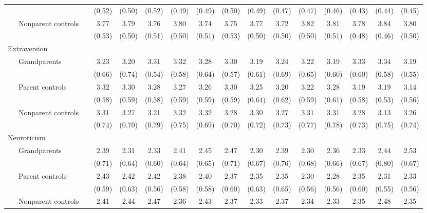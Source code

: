 \begin{appendix}
\begin{lltable}
{\begin{longtable}{lccccccccccccc}
\ \ \ \textcolor{white}{Cp} & (0.52) & (0.50) & (0.52) & (0.49) & (0.49) & (0.50) & (0.49) & (0.47) & (0.47) & (0.46) & (0.43) & (0.44) & (0.45)\\
\ \ \ Nonparent controls \textcolor{white}{C} & 3.77 & 3.79 & 3.76 & 3.80 & 3.74 & 3.75 & 3.77 & 3.72 & 3.82 & 3.81 & 3.78 & 3.84 & 3.80\\
\ \ \ \textcolor{white}{Cn} & (0.53) & (0.50) & (0.51) & (0.50) & (0.51) & (0.53) & (0.50) & (0.50) & (0.50) & (0.51) & (0.48) & (0.46) & (0.50)\\
Extraversion &  &  &  &  &  &  &  &  &  &  &  &  & \\
\ \ \ Grandparents \textcolor{white}{E} & 3.23 & 3.20 & 3.31 & 3.32 & 3.28 & 3.30 & 3.19 & 3.24 & 3.22 & 3.19 & 3.33 & 3.34 & 3.19\\
\ \ \ \textcolor{white}{Eg} & (0.66) & (0.74) & (0.54) & (0.58) & (0.64) & (0.57) & (0.61) & (0.69) & (0.65) & (0.60) & (0.60) & (0.58) & (0.55)\\
\ \ \ Parent controls \textcolor{white}{E} & 3.32 & 3.30 & 3.28 & 3.27 & 3.26 & 3.30 & 3.25 & 3.20 & 3.22 & 3.28 & 3.19 & 3.19 & 3.14\\
\ \ \ \textcolor{white}{Ep} & (0.58) & (0.59) & (0.58) & (0.59) & (0.59) & (0.59) & (0.64) & (0.62) & (0.59) & (0.61) & (0.58) & (0.53) & (0.56)\\
\ \ \ Nonparent controls \textcolor{white}{E} & 3.31 & 3.27 & 3.21 & 3.32 & 3.32 & 3.28 & 3.30 & 3.27 & 3.31 & 3.31 & 3.28 & 3.13 & 3.26\\
\ \ \ \textcolor{white}{En} & (0.74) & (0.70) & (0.79) & (0.75) & (0.69) & (0.70) & (0.72) & (0.73) & (0.77) & (0.78) & (0.73) & (0.75) & (0.74)\\
Neuroticism &  &  &  &  &  &  &  &  &  &  &  &  & \\
\ \ \ Grandparents \textcolor{white}{N} & 2.39 & 2.31 & 2.33 & 2.41 & 2.45 & 2.47 & 2.30 & 2.39 & 2.30 & 2.36 & 2.33 & 2.44 & 2.53\\
\ \ \ \textcolor{white}{Ng} & (0.71) & (0.64) & (0.60) & (0.64) & (0.65) & (0.71) & (0.67) & (0.76) & (0.68) & (0.66) & (0.67) & (0.80) & (0.67)\\
\ \ \ Parent controls \textcolor{white}{N} & 2.43 & 2.42 & 2.42 & 2.38 & 2.40 & 2.37 & 2.35 & 2.35 & 2.30 & 2.28 & 2.35 & 2.31 & 2.33\\
\ \ \ \textcolor{white}{Np} & (0.59) & (0.63) & (0.56) & (0.58) & (0.58) & (0.60) & (0.63) & (0.65) & (0.56) & (0.56) & (0.60) & (0.55) & (0.56)\\
\ \ \ Nonparent controls \textcolor{white}{N} & 2.41 & 2.44 & 2.47 & 2.36 & 2.43 & 2.37 & 2.33 & 2.37 & 2.34 & 2.33 & 2.35 & 2.48 & 2.35\\

\end{longtable}}
\end{lltable}
\end{appendix}
